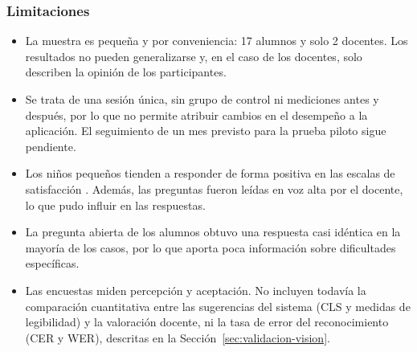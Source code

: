 \subsubsection{Limitaciones}
\begin{itemize}
    \item La muestra es pequeña y por conveniencia: 17 alumnos y solo 2 docentes. Los resultados no pueden generalizarse y, en el caso de los docentes, solo describen la opinión de los participantes.
    \item Se trata de una sesión única, sin grupo de control ni mediciones antes y después, por lo que no permite atribuir cambios en el desempeño a la aplicación. El seguimiento de un mes previsto para la prueba piloto sigue pendiente.
    \item Los niños pequeños tienden a responder de forma positiva en las escalas de satisfacción \cite{read2006funtoolkit}. Además, las preguntas fueron leídas en voz alta por el docente, lo que pudo influir en las respuestas.
    \item La pregunta abierta de los alumnos obtuvo una respuesta casi idéntica en la mayoría de los casos, por lo que aporta poca información sobre dificultades específicas.
    \item Las encuestas miden percepción y aceptación. No incluyen todavía la comparación cuantitativa entre las sugerencias del sistema (CLS y medidas de legibilidad) y la valoración docente, ni la tasa de error del reconocimiento (CER y WER), descritas en la Sección~\ref{sec:validacion-vision}. %
\end{itemize}
